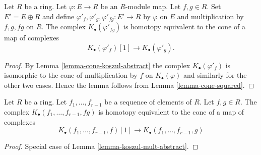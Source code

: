 \begin{lemma}
\label{lemma-koszul-mult-abstract}
Let $R$ be a ring. Let $\varphi : E \to R$ be an $R$-module map.
Let $f, g \in R$. Set $E' = E \oplus R$ and define
$\varphi'_f, \varphi'_g, \varphi'_{fg} : E' \to R$
by $\varphi$ on $E$ and multiplication by $f, g, fg$ on $R$.
The complex $K_\bullet(\varphi'_{fg})$ is homotopy equivalent to the
cone of a map of complexes
$$
K_\bullet(\varphi'_f)[1]
\longrightarrow
K_\bullet(\varphi'_g).
$$
\end{lemma}

\begin{proof}
By
Lemma \ref{lemma-cone-koszul-abstract}
the complex $K_\bullet(\varphi'_f)$ is isomorphic to the cone of
multiplication by $f$ on $K_\bullet(\varphi)$ and similarly
for the other two cases. Hence the lemma follows from
Lemma \ref{lemma-cone-squared}.
\end{proof}

\begin{lemma}
\label{lemma-koszul-mult}
Let $R$ be a ring. Let $f_1, \ldots, f_{r - 1}$ be a sequence of elements
of $R$. Let $f, g \in R$. The complex
$K_\bullet(f_1, \ldots, f_{r - 1}, fg)$
is homotopy equivalent to the cone of a map of complexes
$$
K_\bullet(f_1, \ldots, f_{r - 1}, f)[1]
\longrightarrow
K_\bullet(f_1, \ldots, f_{r - 1}, g)
$$
\end{lemma}

\begin{proof}
Special case of
Lemma \ref{lemma-koszul-mult-abstract}.
\end{proof}
